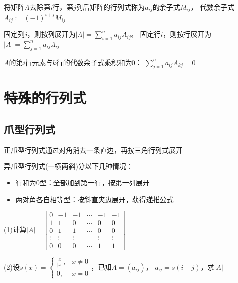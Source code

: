 \begin{definition}[余子式与代数余子式]
  将矩阵$A$去除第$i$行，第$j$列后矩阵的行列式称为$a_{ij}$的余子式$M_{ij}$，
  代数余子式$A_{ij} := (-1)^{i+j}M_{ij}$
\end{definition}


\begin{theorem}[行列式展开]
  固定列$j$，则按列展开为$|A| = \sum\limits_{i = 1}^n a_{ij}A_{ij}$。
  固定行$i$，则按行展开为$|A| = \sum\limits_{j = 1}^n a_{ij}A_{ij}$
\end{theorem}


\begin{theorem}[不同行相乘为0]
  $A$的第$i$行元素与$k$行的代数余子式乘积和为$0$：
  $\sum\limits_{j = 1}^n a_{ij}A_{kj} = 0$
\end{theorem}



\section{特殊的行列式}

\subsection{爪型行列式}

\begin{theorem}[正爪型行列式]
  正爪型行列式通过对角消去一条直边，再按三角行列式展开
\end{theorem}

\begin{theorem}[异爪型行列式]
  异爪型行列式(一横两斜)分以下几种情况：
  \begin{itemize}
  \item 行和为$0$型：全部加到第一行，按第一列展开
  \item 两对角各自相等型：按斜直夹边展开，获得递推公式
  \end{itemize}
\end{theorem}

\begin{exercise}[异爪型行列式]
  (1)计算$|A| = \left|
    \begin{array}{cccccc}
      0&-1&-1&\cdots&-1&-1 \\
       1&1&0&\cdots&0&0 \\
       0&1&1&\cdots&0&0 \\
       \vdots&\vdots&\vdots&&\vdots&\vdots \\
       0&0&0&\cdots&1&1
    \end{array}
  \right|$

  (2)设$s(x) =
  \begin{cases}
    \frac{x}{|x|}, & x \neq 0\\
    0, & x = 0
  \end{cases}
  $，已知$A = (a_{ij})$，
  $a_{ij }= s(i-j)$，求$|A|$
\end{exercise}

